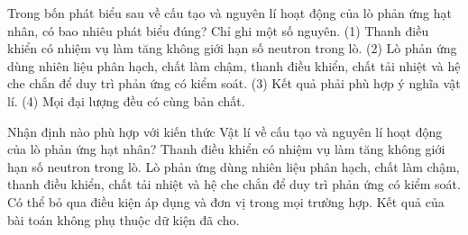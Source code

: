 \begin{ex}
Trong bốn phát biểu sau về cấu tạo và nguyên lí hoạt động của lò phản ứng hạt nhân, có bao nhiêu phát biểu đúng? Chỉ ghi một số nguyên. (1) Thanh điều khiển có nhiệm vụ làm tăng không giới hạn số neutron trong lò. (2) Lò phản ứng dùng nhiên liệu phân hạch, chất làm chậm, thanh điều khiển, chất tải nhiệt và hệ che chắn để duy trì phản ứng có kiểm soát. (3) Kết quả phải phù hợp ý nghĩa vật lí. (4) Mọi đại lượng đều có cùng bản chất.
\end{ex}

\begin{ex}
Nhận định nào phù hợp với kiến thức Vật lí về cấu tạo và nguyên lí hoạt động của lò phản ứng hạt nhân?
\choice
{Thanh điều khiển có nhiệm vụ làm tăng không giới hạn số neutron trong lò.}
{\True Lò phản ứng dùng nhiên liệu phân hạch, chất làm chậm, thanh điều khiển, chất tải nhiệt và hệ che chắn để duy trì phản ứng có kiểm soát.}
{Có thể bỏ qua điều kiện áp dụng và đơn vị trong mọi trường hợp.}
{Kết quả của bài toán không phụ thuộc dữ kiện đã cho.}
\end{ex}

